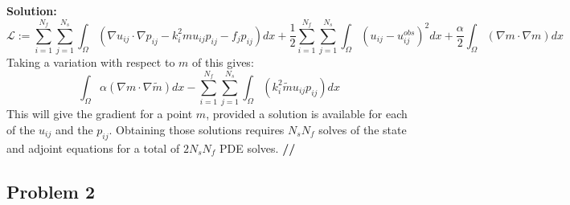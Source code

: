 \documentclass[11pt]{article}
\newenvironment{solution}{\begin{trivlist}\item[]{\bf Solution:}}
                      {\textbf{//} \end{trivlist}}
\begin{document}
\begin{enumerate}
\begin{solution}
\begin{displaymath}
\mathcal{L} := \sum_{i=1}^{N_f}\sum_{j=1}^{N_s}\int_{\Omega}\left(\nabla
 u_{ij} \cdot \nabla p_{ij} - k_i^2mu_{ij}p_{ij} - f_jp_{ij}\right)dx +
 \frac{1}{2}\sum_{i=1}^{N_f}\sum_{j=1}^{N_s}\int_{\Omega}\left(u_{ij} -
 u_{ij}^{obs}\right)^2 dx + \frac{\alpha}{2}\int_{\Omega}(\nabla m \cdot
 \nabla m) dx 
\end{displaymath}
Taking a variation with respect to $m$ of this gives:
\begin{displaymath} 
\int_{\Omega} \alpha (\nabla m \cdot \nabla\tilde{m})dx -
 \sum_{i=1}^{N_f}\sum_{j=1}^{N_s}\int_{\Omega}(k_i^2\tilde{m}u_{ij}p_{ij})dx 
\end{displaymath}
This will give the gradient for a point $m$, provided a solution is
 available for each of the $u_{ij}$ and the $p_{ij}$. Obtaining those
 solutions requires $N_sN_f$ solves of the state and adjoint equations
 for a total of $2N_sN_f$ PDE solves. 
\end{solution}
\end{enumerate}

\newpage
\subsection*{Problem 2}
\end{document}
